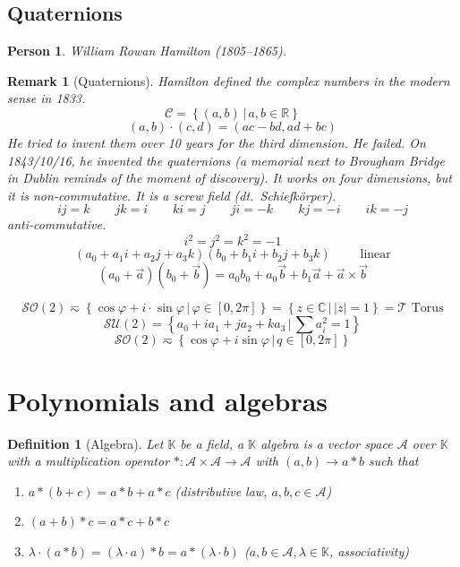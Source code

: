 \documentclass[a4paper]{article}
\newcounter{lecref}[section]
\numberwithin{lecref}{section}
\newtheorem{definition}[lecref]{Definition}
\newtheorem*{Remark}{Remark}
\newtheorem*{Person}{Person}
\newcommand{\setdef}[2]{\left\{\left.#1\,\right|\,#2\right\}}
\newcommand{\card}[1]{\left|#1\right|}
\begin{document}
\subsection{Quaternions}

\begin{Person}
  William Rowan Hamilton (1805--1865).
\end{Person}

\begin{Remark}[Quaternions]
  Hamilton defined the complex numbers in the modern sense in 1833.
  \[ \mathcal C = \setdef{(a,b)}{a,b \in \mathbb R} \]
  \[ (a,b) \cdot (c, d) = (ac - bd, ad + bc) \]
  He tried to invent them over 10 years for the third dimension.
  He failed.
  On 1843/10/16, he invented the quaternions (a memorial next to Brougham Bridge in Dublin reminds of the moment of discovery).
  It works on four dimensions, but it is non-commutative.
  It is a screw field (dt.~\foreignlanguage{german}{Schiefk\"orper}).
  \[ ij = k \qquad jk = i \qquad ki = j \qquad ji = -k \qquad kj = -i \qquad ik = -j \]
  anti-commutative.
  \[ i^2 = j^2 = k^2 = -1 \]
  \[ (a_0 + a_1 i + a_2 j + a_3 k) (b_0 + b_1 i + b_2 j + b_3 k) \qquad \text{ linear} \]
  \[ (a_0 + \vec a) (b_0 + \vec b) = a_0 b_0 + a_0 \vec b + b_1 \vec a + \vec a \times \vec b \]
\end{Remark}

\[ \mathcal{SO}(2) \eqsim \setdef{\cos\varphi + i \cdot \sin\varphi}{\varphi \in [0,2\pi]} = \setdef{z \in \mathbb C}{\card{z} = 1} = \mathcal T \text{ Torus} \]
\[ \mathcal{SU}(2) = \setdef{a_0 + i a_1 + j a_2 + k a_3}{\sum a_i^2 = 1} \]
\[ \mathcal{SO}(2) \eqsim \setdef{\cos \varphi + i \sin\varphi}{q \in [0,2\pi]} \]

\section{Polynomials and algebras} %

\begin{definition}[Algebra] %
  Let $\mathbb K$ be a field, a $\mathbb K$ algebra is a vector space $\mathcal A$ over $\mathbb K$
  with a multiplication operator $*: \mathcal A \times \mathcal A \to \mathcal A$ with $(a,b) \to a * b$ such that
  \begin{enumerate}
    \item $a * (b + c) = a * b + a * c$ (distributive law, $a, b, c \in \mathcal A$)
    \item $(a + b) * c = a * c + b * c$
    \item $\lambda \cdot (a * b) = (\lambda \cdot a) * b = a * (\lambda \cdot b)$ ($a, b \in \mathcal A, \lambda \in \mathbb K$, associativity)
  \end{enumerate}
\end{definition}
\end{document}
